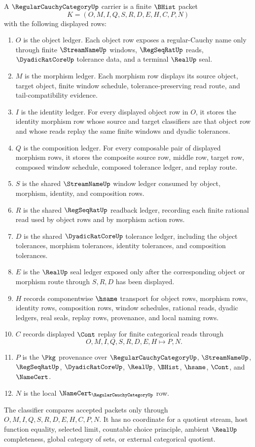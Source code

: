 \begin{definition}
\label{def:regular-cauchy-category-carrier}
A $\RegularCauchyCategoryUp$ carrier is a finite $\BHist$ packet
$$
K=(O,M,I,Q,S,R,D,E,H,C,P,N)
$$
with the following displayed rows:
\begin{enumerate}
\item $O$ is the object ledger. Each object row exposes a regular-Cauchy name only through finite $\StreamNameUp$ windows, $\RegSeqRatUp$ reads, $\DyadicRatCoreUp$ tolerance data, and a terminal $\RealUp$ seal.
\item $M$ is the morphism ledger. Each morphism row displays its source object, target object, finite window schedule, tolerance-preserving read route, and tail-compatibility evidence.
\item $I$ is the identity ledger. For every displayed object row in $O$, it stores the identity morphism row whose source and target classifiers are that object row and whose reads replay the same finite windows and dyadic tolerances.
\item $Q$ is the composition ledger. For every composable pair of displayed morphism rows, it stores the composite source row, middle row, target row, composed window schedule, composed tolerance ledger, and replay route.
\item $S$ is the shared $\StreamNameUp$ window ledger consumed by object, morphism, identity, and composition rows.
\item $R$ is the shared $\RegSeqRatUp$ readback ledger, recording each finite rational read used by object rows and by morphism action rows.
\item $D$ is the shared $\DyadicRatCoreUp$ tolerance ledger, including the object tolerances, morphism tolerances, identity tolerances, and composition tolerances.
\item $E$ is the $\RealUp$ seal ledger exposed only after the corresponding object or morphism route through $S,R,D$ has been displayed.
\item $H$ records componentwise $\hsame$ transport for object rows, morphism rows, identity rows, composition rows, window schedules, rational reads, dyadic ledgers, real seals, replay rows, provenance, and local naming rows.
\item $C$ records displayed $\Cont$ replay for finite categorical reads through
$$
O,M,I,Q,S,R,D,E,H \longmapsto P,N .
$$
\item $P$ is the $\Pkg$ provenance over $\RegularCauchyCategoryUp$, $\StreamNameUp$, $\RegSeqRatUp$, $\DyadicRatCoreUp$, $\RealUp$, $\BHist$, $\hsame$, $\Cont$, and $\NameCert$.
\item $N$ is the local $\NameCert_{\RegularCauchyCategoryUp}$ row.
\end{enumerate}
The classifier compares accepted packets only through $O,M,I,Q,S,R,D,E,H,C,P,N$. It has no coordinate for a quotient stream, host function equality, selected limit, countable choice principle, ambient $\RealUp$ completeness, global category of sets, or external categorical quotient.
\end{definition}

